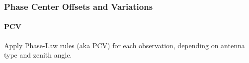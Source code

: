 \documentclass{beamer}
\begin{document}
\begin{frame}\frametitle{Phase Center Offsets and Variations}\framesubtitle{PCV}
  Apply Phase-Law rules (aka PCV) for each observation, depending on antenna type 
  and zenith angle.
\end{frame}



\end{document}
